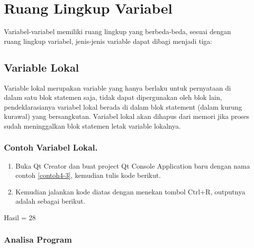 \section{Ruang Lingkup Variabel}\label{ruang-lingkup-variabel}

Variabel-variabel memiliki ruang lingkup yang berbeda-beda, sesuai
dengan ruang lingkup variabel, jenis-jenis variable dapat dibagi menjadi
tiga:

\subsection{Variable Lokal}\label{variable-lokal}

Variable lokal merupakan variable yang hanya berlaku untuk pernyataan di
dalam satu blok statemen saja, tidak dapat dipergunakan oleh blok lain,
pendeklarasianya variabel lokal berada di dalam blok statement (dalam
kurung kurawal) yang bersangkutan. Variabel lokal akan dihapus dari
memori jika proses sudah meninggalkan blok statemen letak variable
lokalnya.

\subsubsection*{Contoh Variabel Lokal.}

\begin{enumerate}

\item
 Buka Qt Creator dan buat project Qt Console Application baru dengan
 nama contoh \ref{contoh4-3}, kemudian tulis kode berikut.



\item
 Kemudian jalankan kode diatas dengan menekan tombol Ctrl+R, outputnya
 adalah sebagai berikut.
\end{enumerate}

\begin{lcverbatim}
Hasil = 28
\end{lcverbatim}


\subsubsection*{Analisa Program}

